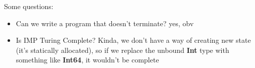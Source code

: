 Some questions:
\begin{itemize}
\item Can we write a program that doesn't terminate? yes, obv
\item Is IMP Turing Complete? Kinda, we don't have a way of creating new state (it's statically allocated), so if we replace the unbound \textbf{Int} type with something like \textbf{Int64}, it wouldn't be complete
\end{itemize}

% 
